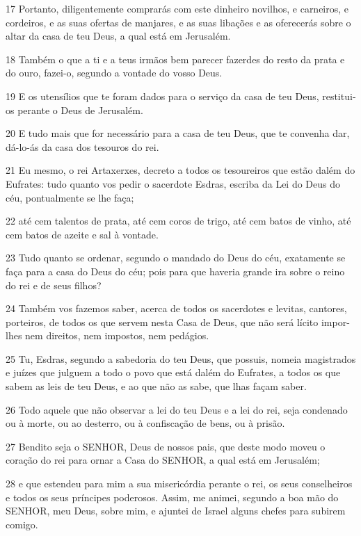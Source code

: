 \par 17 Portanto, diligentemente comprarás com este dinheiro novilhos, e carneiros, e cordeiros, e as suas ofertas de manjares, e as suas libações e as oferecerás sobre o altar da casa de teu Deus, a qual está em Jerusalém.
\par 18 Também o que a ti e a teus irmãos bem parecer fazerdes do resto da prata e do ouro, fazei-o, segundo a vontade do vosso Deus.
\par 19 E os utensílios que te foram dados para o serviço da casa de teu Deus, restitui-os perante o Deus de Jerusalém.
\par 20 E tudo mais que for necessário para a casa de teu Deus, que te convenha dar, dá-lo-ás da casa dos tesouros do rei.
\par 21 Eu mesmo, o rei Artaxerxes, decreto a todos os tesoureiros que estão dalém do Eufrates: tudo quanto vos pedir o sacerdote Esdras, escriba da Lei do Deus do céu, pontualmente se lhe faça;
\par 22 até cem talentos de prata, até cem coros de trigo, até cem batos de vinho, até cem batos de azeite e sal à vontade.
\par 23 Tudo quanto se ordenar, segundo o mandado do Deus do céu, exatamente se faça para a casa do Deus do céu; pois para que haveria grande ira sobre o reino do rei e de seus filhos?
\par 24 Também vos fazemos saber, acerca de todos os sacerdotes e levitas, cantores, porteiros, de todos os que servem nesta Casa de Deus, que não será lícito impor-lhes nem direitos, nem impostos, nem pedágios.
\par 25 Tu, Esdras, segundo a sabedoria do teu Deus, que possuis, nomeia magistrados e juízes que julguem a todo o povo que está dalém do Eufrates, a todos os que sabem as leis de teu Deus, e ao que não as sabe, que lhas façam saber.
\par 26 Todo aquele que não observar a lei do teu Deus e a lei do rei, seja condenado ou à morte, ou ao desterro, ou à confiscação de bens, ou à prisão.
\par 27 Bendito seja o SENHOR, Deus de nossos pais, que deste modo moveu o coração do rei para ornar a Casa do SENHOR, a qual está em Jerusalém;
\par 28 e que estendeu para mim a sua misericórdia perante o rei, os seus conselheiros e todos os seus príncipes poderosos. Assim, me animei, segundo a boa mão do SENHOR, meu Deus, sobre mim, e ajuntei de Israel alguns chefes para subirem comigo.

